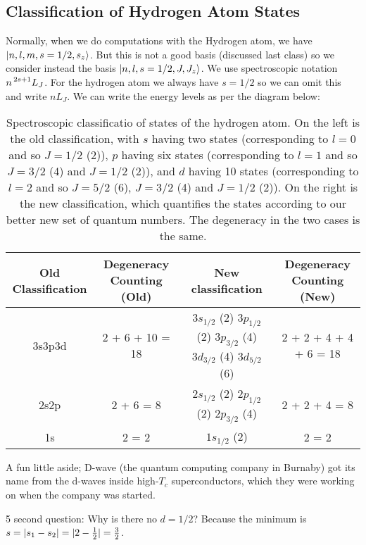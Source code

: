 \subsection{Classification of Hydrogen Atom States}
Normally, when we do computations with the Hydrogen atom, we have $\lvert n, l, m, s=1/2, s_z \rangle$. But this is not a good basis (discussed last class) so we consider instead the basis $\lvert n, l, s=1/2, J, J_z \rangle$. We use spectroscopic notation $n\prescript{2s+1}{}{L}_J$. For the hydrogen atom we always have $s = 1/2$ so we can omit this and write $nL_J$. We can write the energy levels as per the diagram below:

\begin{table}[htbp]
    \centering\begin{tabular}{|c|c|c|c|}
        \hline Old Classification & Degeneracy Counting (Old) & New classification & Degeneracy Counting (New)
        \\ \hline 3s3p3d & 2 + 6 + 10 = 18 & $3s_{1/2}$ (2) $3p_{1/2}$ (2) $3p_{3/2}$ (4) $3d_{3/2}$ (4) $3d_{5/2}$ (6) & 2 + 2 + 4 + 4 + 6 = 18
        \\ \hline 2s2p & 2 + 6 = 8 & $2s_{1/2}$ (2) $2p_{1/2}$ (2) $2p_{3/2}$ (4) & 2 + 2 + 4 = 8
        \\ \hline 1s & 2 = 2 & $1s_{1/2}$ (2) & 2 = 2
        \\ \hline
    \end{tabular}
    \caption{Spectroscopic classificatio of states of the hydrogen atom. On the left is the old classification, with $s$ having two states (corresponding to $l = 0$ and so $J = 1/2$ (2)), $p$ having six states (corresponding to $l = 1$ and so $J = 3/2$ (4) and $J = 1/2$ (2)), and $d$ having 10 states (corresponding to $l = 2$ and so $J = 5/2$ (6), $J = 3/2$ (4) and $J = 1/2$ (2)). On the right is the new classification, which quantifies the states according to our better new set of quantum numbers. The degeneracy in the two cases is the same.}
    \label{table-Hclassification}
\end{table}

A fun little aside; D-wave (the quantum computing company in Burnaby) got its name from the d-waves inside high-$T_c$ superconductors, which they were working on when the company was started.

5 second question: Why is there no $d = 1/2$? Because the minimum is $s = \lvert s_1 - s_2 \rvert = \lvert 2 - \frac{1}{2} \rvert = \frac{3}{2}$. 

